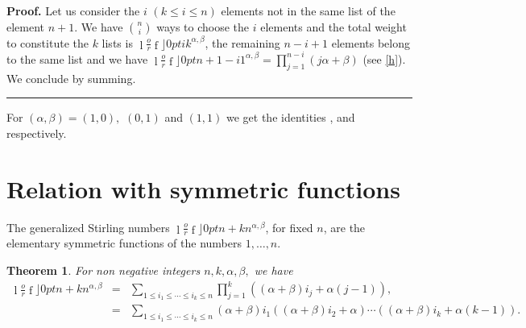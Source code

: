 \documentclass{article}
\newcommand {\lah}[2]{\genfrac\lfloor \rfloor{0pt}{}{#1}{#2}}
\newtheorem{theorem}{Theorem}
\newenvironment{proof}[1][Proof]{\noindent\textbf{#1.} }{\ \rule{0.5em}{0.5em}}
\begin{document}
\begin{proof}
Let us consider the $i$ $(k\leqslant i\leqslant n)$ elements not in the same list of the element $n+1$. We have $\binom{n}{i}$ ways to choose the $i$ elements and the total weight to constitute the $k$ lists is $\lah{i}{k}^{\alpha ,\beta }$, the remaining $n-i+1$ elements belong to the same list and we have $%
\lah{n+1-i}{1}^{\alpha ,\beta }=\prod_{j=1}^{n-i}\left( j\alpha +\beta \right) $ (see \ref{h}). We conclude by summing.
\end{proof}

For $\left( \alpha ,\beta \right) =\left( 1,0\right) ,$ $\left( 0,1\right) $
and $\left( 1,1\right) $ we get the identities \cite[eq. 30]{MR743795}, \cite%
[eq. 35]{MR743795} and \cite[eq. 11]{BelBou14} respectively.

\section{Relation with symmetric functions}

The generalized Stirling numbers $\lah{n+k}{n}^{\alpha
,\beta }$, for fixed $n$, are the elementary symmetric functions of the
numbers $1,\ldots ,n$.

\begin{theorem}
For non negative integers $n,k,\alpha ,\beta ,$ we have%
\begin{eqnarray*}
\lah{n+k}{n}^{\alpha ,\beta } &=&\sum_{1\leqslant
i_{1}\leqslant \cdots \leqslant i_{k}\leqslant
n}\prod\limits_{j=1}^{k}\left( \left( \alpha +\beta \right) i_{j}+\alpha
\left( j-1\right) \right) , \\
&=&\sum_{1\leqslant i_{1}\leqslant \cdots \leqslant i_{k}\leqslant n}\left(
\alpha +\beta \right) i_{1}\left( \left( \alpha +\beta \right) i_{2}+\alpha
\right) \cdots \left( \left( \alpha +\beta \right) i_{k}+\alpha \left(
k-1\right) \right) .
\end{eqnarray*}
\end{theorem}
\end{document}
